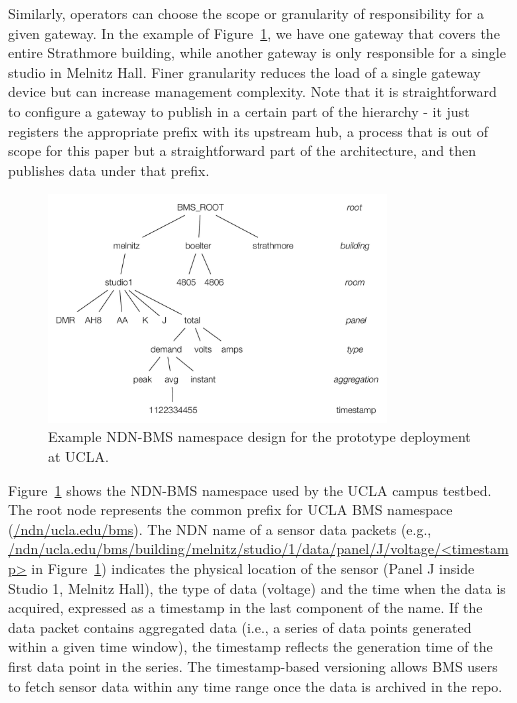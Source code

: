 Similarly, operators can choose the scope or granularity of responsibility for a given gateway.
In the example of Figure~\ref{design:ns}, we have one gateway that covers the entire Strathmore building, while another gateway is only responsible for a single studio in Melnitz Hall.
Finer granularity reduces the load of a single gateway device but can increase management complexity.
Note that it is straightforward to configure a gateway to publish in a certain part of the hierarchy - it just registers the appropriate prefix with its upstream hub, a process that is out of scope for this paper but a straightforward part of the architecture, and then publishes data under that prefix. 

\begin{figure}[!ht]
\centering
\includegraphics[width=0.8\textwidth, keepaspectratio=true]{figures/bms-namespace-new.pdf}
\caption{Example NDN-BMS namespace design for the prototype deployment at UCLA.}
\label{design:ns}
\end{figure}

Figure~\ref{design:ns} shows the NDN-BMS namespace used by the UCLA campus testbed.
The root node represents the common prefix for UCLA BMS namespace (\url{/ndn/ucla.edu/bms}).
The NDN name of a sensor data packets (e.g., \url{/ndn/ucla.edu/bms/building/melnitz/studio/1/data/panel/J/voltage/<timestamp>} in Figure~\ref{design:ns}) indicates the physical location of the sensor (Panel J inside Studio 1, Melnitz Hall), the type of data (voltage) and the time when the data is acquired, expressed as a timestamp in the last component of the name.
If the data packet contains aggregated data (i.e., a series of data points generated within a given time window), the timestamp reflects the generation time of the first data point in the series. 
The timestamp-based versioning allows BMS users to fetch sensor data within any time range once the data is archived in the repo.

